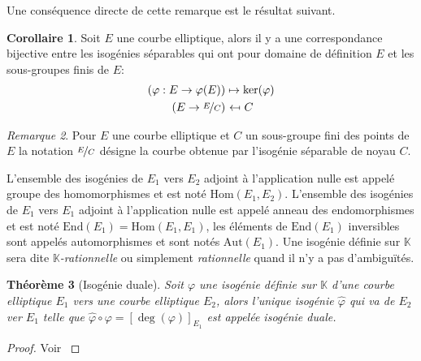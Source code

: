 \documentclass[10pt,a4paper]{book}
\theoremstyle{plain}
\newtheorem{thm}{Théorème}[chapter]
\theoremstyle{definition}
\theoremstyle{definition}
\newtheorem{cor}[thm]{Corollaire}
\theoremstyle{definition}
\theoremstyle{definition}
\theoremstyle{remark}
\newtheorem{rem}[thm]{Remarque}
\theoremstyle{remark}
\theoremstyle{definition}
\begin{document}
Une conséquence directe de cette remarque est le résultat suivant.

\begin{cor}
Soit $E$ une courbe elliptique, alors il y a une correspondance bijective entre les isogénies séparables qui ont pour domaine de définition $E$ et les sous-groupes finis de $E$:
\begin{equation*}
\begin{alignedat}{1}
(\varphi :E\rightarrow \varphi(E)) &\mapsto  \ker(\varphi)  \\
 (E\rightarrow\nicefrac{E}{C})  &\  \reflectbox{$\mapsto$} \ C 
\end{alignedat}
\end{equation*}
\end{cor}

\begin{rem}
Pour $E$ une courbe elliptique et $C$ un sous-groupe fini des points de $E$ la notation $\nicefrac{E}{C}$ désigne la courbe obtenue par l'isogénie séparable de noyau $C$.
\end{rem}

L'ensemble des isogénies de $E_1$ vers $E_2$ adjoint à l'application nulle est appelé groupe des homomorphismes et est noté \emph{$\mathrm{Hom}(E_1,E_2)$}. L'ensemble des isogénies de $E_1$ vers $E_1$ adjoint à l'application nulle est appelé anneau des endomorphismes et est noté \emph{$\mathrm{End}(E_1)=\mathrm{Hom}(E_1,E_1)$}, les éléments de $\mathrm{End}(E_1)$ inversibles sont appelés automorphismes et sont notés \emph{$\mathrm{Aut}(E_1)$}. Une isogénie définie sur $\mathbb{K}$ sera dite \emph{$\mathbb{K}$-rationnelle} ou simplement \emph{rationnelle} quand il n'y a pas d'ambiguïtés.

\begin{thm}[Isogénie duale]
Soit $\varphi$ une isogénie définie sur $\mathbb{K}$ d'une courbe elliptique $E_1$ vers une courbe elliptique $E_2$, alors l'unique isogénie $\widehat{\varphi}$ qui va de $E_2$ ver $E_1$ telle que $\widehat{\varphi}\circ\varphi=[\deg(\varphi)]_{E_1}$ est appelée \emph{isogénie duale}.
\end{thm}

\begin{proof}
Voir \cite[III.6.1]{Silv1}
\end{proof}
\end{document}
